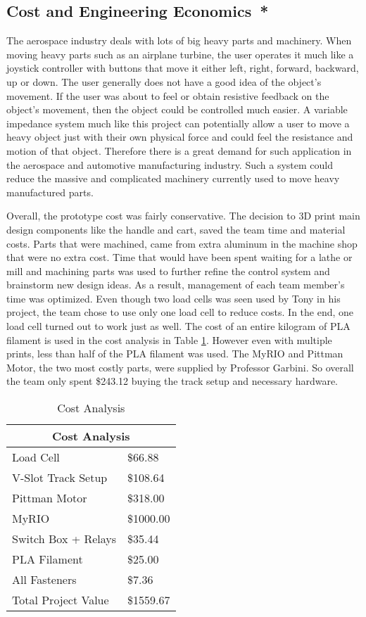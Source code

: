 \subsection*{Cost and Engineering Economics{{\color{red}\ *}}}
The aerospace industry deals with lots of big heavy parts and machinery. When moving heavy parts such as an airplane turbine, the user operates it much like a joystick controller with buttons that move it either left, right, forward, backward, up or down. The user generally does not have a good idea of the object's movement. If the user was about to feel or obtain resistive feedback on the object's movement, then the object could be controlled much easier. A variable impedance system much like this project can potentially allow a user to move a heavy object just with their own physical force and could feel the resistance and motion of that object. Therefore there is a great demand for such application in the aerospace and automotive manufacturing industry. Such a system could reduce the massive and complicated machinery currently used to move heavy manufactured parts.

Overall, the prototype cost was fairly conservative. The decision to 3D print main design components like the handle and cart, saved the team time and material costs. Parts that were machined, came from extra aluminum in the machine shop that were no extra cost. Time that would have been spent waiting for a lathe or mill and machining parts was used to further refine the control system and brainstorm new design ideas. As a result, management of each team member's time was optimized. Even though two load cells was seen used by Tony in his project, the team chose to use only one load cell to reduce costs. In the end, one load cell turned out to work just as well. The cost of an entire kilogram of PLA filament is used in the cost analysis in Table \ref{cost_analysis}. However even with multiple prints, less than half of the PLA filament was used. The MyRIO and Pittman Motor, the two most costly parts, were supplied by Professor Garbini. So overall the team only spent \$243.12 buying the track setup and necessary hardware.
\begin{table}[H]
	\caption{Cost Analysis}
	\centering
	\label{cost_analysis}
	\begin{tabular}{|l|l|}
		\hline
		\multicolumn{2}{|c|}{Cost Analysis} \\ \hline	\hline
		Load Cell             & \$66.88     \\ \hline
		V-Slot Track Setup    & \$108.64    \\ \hline
		Pittman Motor         & \$318.00    \\ \hline
		MyRIO                 & \$1000.00   \\ \hline
		Switch Box + Relays   & \$35.44     \\ \hline
		PLA Filament          & \$25.00     \\ \hline
		All Fasteners         & \$7.36      \\ \hline	\hline
		Total Project Value   & \$1559.67   \\ \hline
	\end{tabular}
\end{table}